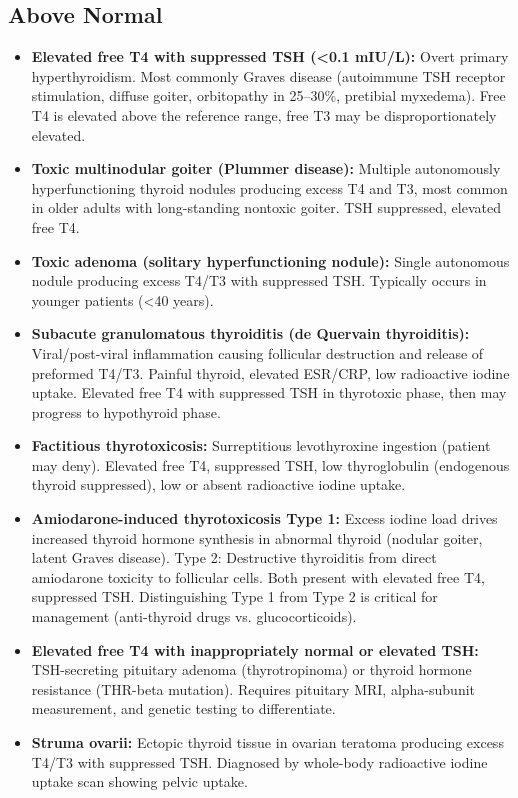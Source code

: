 \subsection*{Above Normal}
\begin{itemize}
  \item \textbf{Elevated free T4 with suppressed TSH (<0.1 mIU/L):} Overt primary hyperthyroidism. Most commonly Graves disease (autoimmune TSH receptor stimulation, diffuse goiter, orbitopathy in 25--30\%, pretibial myxedema). Free T4 is elevated above the reference range, free T3 may be disproportionately elevated.
  \item \textbf{Toxic multinodular goiter (Plummer disease):} Multiple autonomously hyperfunctioning thyroid nodules producing excess T4 and T3, most common in older adults with long-standing nontoxic goiter. TSH suppressed, elevated free T4.
  \item \textbf{Toxic adenoma (solitary hyperfunctioning nodule):} Single autonomous nodule producing excess T4/T3 with suppressed TSH. Typically occurs in younger patients (<40 years).
  \item \textbf{Subacute granulomatous thyroiditis (de Quervain thyroiditis):} Viral/post-viral inflammation causing follicular destruction and release of preformed T4/T3. Painful thyroid, elevated ESR/CRP, low radioactive iodine uptake. Elevated free T4 with suppressed TSH in thyrotoxic phase, then may progress to hypothyroid phase.
  \item \textbf{Factitious thyrotoxicosis:} Surreptitious levothyroxine ingestion (patient may deny). Elevated free T4, suppressed TSH, low thyroglobulin (endogenous thyroid suppressed), low or absent radioactive iodine uptake.
  \item \textbf{Amiodarone-induced thyrotoxicosis Type 1:} Excess iodine load drives increased thyroid hormone synthesis in abnormal thyroid (nodular goiter, latent Graves disease). Type 2: Destructive thyroiditis from direct amiodarone toxicity to follicular cells. Both present with elevated free T4, suppressed TSH. Distinguishing Type 1 from Type 2 is critical for management (anti-thyroid drugs vs. glucocorticoids).
  \item \textbf{Elevated free T4 with inappropriately normal or elevated TSH:} TSH-secreting pituitary adenoma (thyrotropinoma) or thyroid hormone resistance (THR-beta mutation). Requires pituitary MRI, alpha-subunit measurement, and genetic testing to differentiate.
  \item \textbf{Struma ovarii:} Ectopic thyroid tissue in ovarian teratoma producing excess T4/T3 with suppressed TSH. Diagnosed by whole-body radioactive iodine uptake scan showing pelvic uptake.
\end{itemize}

